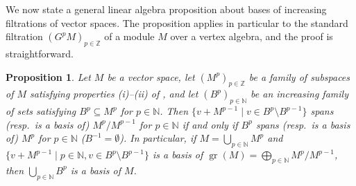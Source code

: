\documentclass[a4paper, 12pt, reqno]{amsart}
\newtheorem{proposition}[theorem]{Proposition}
\theoremstyle{remark}
\DeclareMathOperator{\gr}{gr}
\begin{document}
We now state a general linear algebra proposition about bases of increasing filtrations of vector spaces.
The proposition applies in particular to the standard filtration $(G^pM)_{p \in \mathbb{Z}}$ of a module $M$ over a vertex algebra, and the proof is straightforward.

\begin{proposition}
  \label{prp:19}
  Let $M$ be a vector space, let $(M^p)_{p \in \mathbb{Z}}$ be a family of subspaces of $M$ satisfying properties \emph{(i)--(ii)} of , and let $(B^p)_{p \in \mathbb{N}}$ be an increasing family of sets satisfying $B^p \subseteq M^p$ for $p \in \mathbb{N}$.
  Then $\{v + M^{p - 1} \mid v \in B^p \setminus B^{p - 1}\}$ spans (resp.\ is a basis of) $M^p/M^{p - 1}$ for $p \in \mathbb{N}$ if and only if $B^p$ spans (resp.\ is a basis of) $M^p$ for $p \in \mathbb{N}$ ($B^{-1} = \emptyset$).
  In particular, if $M = \bigcup_{p \in \mathbb{N}}M^p$ and $\{v + M^{p - 1} \mid p \in \mathbb{N}, v \in B^p \setminus B^{p - 1}\}$ is a basis of $\gr(M) = \bigoplus_{p \in \mathbb{N}}M^p/M^{p - 1}$, then $\bigcup_{p \in \mathbb{N}}B^p$ is a basis of $M$.
\end{proposition}
\end{document}
